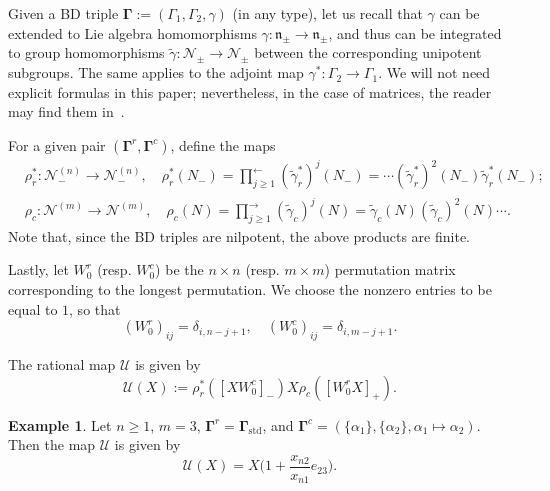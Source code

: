 \documentclass[11pt]{article}
\newcommand{\bg}{\mathbf{\Gamma}}
\newcommand{\std}{\mathrm{std}}
\theoremstyle{definition}\newtheorem{definition}[theorem]{Definition}
\theoremstyle{definition}\newtheorem{remark}[theorem]{Remark}
\newtheorem{example}[theorem]{Example}
\theoremstyle{remark}
\numberwithin{equation}{section}
\begin{document}
Given a BD triple $\bg:=(\Gamma_1,\Gamma_2,\gamma)$ (in any type), let us recall that $\gamma$ can be extended to Lie algebra homomorphisms $\gamma : \mathfrak{n}_{\pm}\rightarrow \mathfrak{n}_{\pm}$, and thus can be integrated to group homomorphisms $\tilde{\gamma} : \mathcal{N}_\pm \rightarrow \mathcal{N}_\pm$ between the corresponding unipotent subgroups. The same applies to the adjoint map $\gamma^* : \Gamma_2 \rightarrow \Gamma_1$. We will not need explicit formulas in this paper;
nevertheless, in the case of matrices, the reader may find them in~\cite[Section 4.1]{multdual}.

For a given pair $(\bg^r,\bg^c)$, define the maps
\begin{align*}
    &\rho_r^* : \mathcal{N}_-^{(n)} \rightarrow \mathcal{N}_-^{(n)}, \quad \rho_r^*(N_-) = \prod_{j\geq 1}^{\leftarrow} (\tilde{\gamma}^*_r)^j(N_-) =   \cdots (\tilde{\gamma}^*_r)^2(N_-)\tilde{\gamma}^*_r(N_-);\\
    &\rho_c: \mathcal{N}^{(m)}\rightarrow \mathcal{N}^{(m)}, \quad \rho_c(N) = \prod_{j \geq 1}^{\rightarrow}(\tilde{\gamma}_c)^j(N) = \tilde{\gamma}_c(N) (\tilde{\gamma}_c)^2(N) \cdots .
\end{align*}
Note that, since the BD triples are nilpotent, the above products are finite.

Lastly, let $W_0^r$ (resp. $W_0^c$) be the $n \times n$ (resp. $m \times m$) permutation matrix corresponding to the longest permutation. We choose the nonzero entries to be equal to $1$, so that
\begin{equation*}
    (W_0^r)_{ij} = \delta_{i,n-j+1}, \quad (W_0^c)_{ij} = \delta_{i,m-j+1}.
\end{equation*}

The rational map $\mathcal{U}$ is given by
\begin{equation}\label{eq:Ubirat}
    \mathcal{U}(X) := \rho_r^*([XW_0^c]_-) X \rho_c([W_0^r X]_+).
\end{equation}

\begin{example}
    Let $n \geq 1$, $m=3$, $\bg^r = \bg_{\std}$, and $\bg^c = (\{\alpha_1\},\{\alpha_2\},\alpha_1\mapsto \alpha_2)$. Then the map $\mathcal{U}$ is given by
    \begin{equation*}
        \mathcal{U}(X) = X\big(1 + \frac{x_{n2}}{x_{n1}}e_{23}\big).
    \end{equation*}
\end{example}
\end{document}

